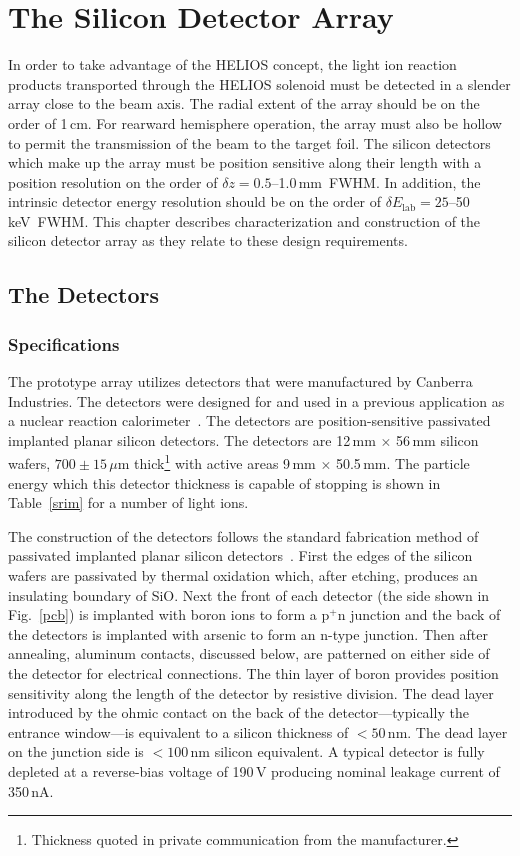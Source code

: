 \chapter{The Silicon Detector Array}
In order to take advantage of the HELIOS concept, the light ion reaction products transported through the HELIOS solenoid must be detected in a slender array close to the beam axis.  The radial extent of the array should be on the order of 1\,cm.  For rearward hemisphere operation, the array must also be hollow to permit the transmission of the beam to the target foil.  The silicon detectors which  make up the array must be position sensitive along their length with a position resolution on the order of $\delta z = 0.5$--1.0\,mm~FWHM.  In addition, the intrinsic detector energy resolution should be on the order of $\delta E_\mathrm{lab} =25$--50\,keV~FWHM.  This chapter describes characterization and construction of the silicon detector array as they relate to these design requirements.
\section{The Detectors}
\label{detectors}
\subsection{Specifications}
The prototype array utilizes detectors that were manufactured by Canberra Industries.  The detectors were designed for and used in a previous application as a nuclear reaction calorimeter~\cite[pp. 100--104]{Blumenthal_PhD}.  The detectors are position-sensitive passivated implanted planar silicon detectors.  The detectors are 12\,mm $\times$ 56\,mm silicon wafers, $700\pm15$\,$\mu$m thick\footnote{Thickness quoted in private communication from the manufacturer.} with active areas 9\,mm $\times$ 50.5\,mm.  The particle energy which this detector thickness is capable of stopping is shown in Table~\ref{srim} for a number of light ions.

The construction of the detectors follows the standard fabrication method of passivated implanted planar silicon detectors~\cite{Kemmer_1984}.  First the edges of the silicon wafers are passivated by thermal oxidation which, after etching, produces an insulating boundary of SiO. Next the front of each detector (the side shown in Fig.~\ref{pcb}) is implanted with boron ions to form a p$^+$n junction and the back of the detectors is implanted with arsenic to form an n-type junction.  Then after annealing, aluminum contacts, discussed below, are patterned on either side of the detector for electrical connections.  The thin layer of boron provides position sensitivity along the length  of the detector by resistive division.  The dead layer introduced by the ohmic contact on the back of the detector---typically the entrance window---is equivalent to a silicon thickness of $<50$\,nm.  The dead layer on the junction side is $<100$\,nm silicon equivalent.  A typical detector is fully depleted at a reverse-bias voltage of 190\,V producing nominal leakage current of 350\,nA.

